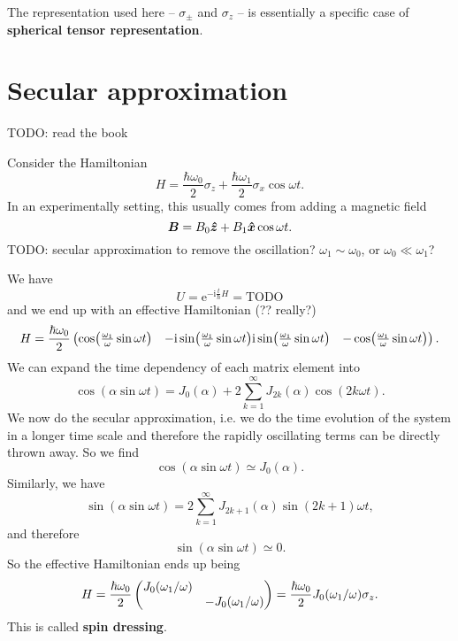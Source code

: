 \documentclass[hyperref, a4paper]{article}
\newcommand*{\ii}{\mathrm{i}}
\newcommand*{\ee}{\mathrm{e}}
\newcommand*{\concept}[1]{{\textbf{#1}}}
\def\\{}%
\begin{document}
The representation used here -- $\sigma_\pm$ and $\sigma_z$ -- 
is essentially a specific case of \concept{spherical tensor representation}.

\section{Secular approximation}

TODO: read the book

Consider the Hamiltonian 
\begin{equation}
    H = \frac{\hbar \omega_0}{2} \sigma_z + 
    \frac{\hbar \omega_1}{2} \sigma_x \cos \omega t.
\end{equation}
In an experimentally setting, 
this usually comes from adding a magnetic field 
\begin{equation}
    \vb*{B} = B_0 \vu*{z} + B_1 \vu*{x} \cos \omega t.
\end{equation}
TODO: secular approximation to remove the oscillation? $\omega_1 \sim \omega_0$, or $\omega_0 \ll \omega_1$?

We have 
\begin{equation}
    U = \ee^{- \ii \frac{t}{\hbar} H} = \text{TODO}
\end{equation}
and we end up with an effective Hamiltonian (?? really?) 
\begin{equation}
    H = \frac{\hbar \omega_0}{2} \pmqty{
        \cos(\frac{\omega_1}{\omega} \sin \omega t) &
        - \ii \sin(\frac{\omega_1}{\omega} \sin \omega t) \\
        \ii \sin(\frac{\omega_1}{\omega} \sin \omega t) &
        - \cos(\frac{\omega_1}{\omega} \sin \omega t)
    }.
\end{equation}
We can expand the time dependency of each matrix element into 
\begin{equation}
    \cos (\alpha \sin \omega t) = J_0 (\alpha) 
    + 2 \sum_{k=1}^{\infty} J_{2k}(\alpha)
    \cos(2 k \omega t).
\end{equation}
We now do the secular approximation, 
i.e. we do the time evolution of the system in a longer time scale 
and therefore the rapidly oscillating terms can be directly thrown away. 
So we find 
\begin{equation}
    \cos (\alpha \sin \omega t) \simeq J_0 (\alpha).
\end{equation}
Similarly, we have 
\begin{equation}
    \sin (\alpha \sin \omega t) = 2 \sum_{k=1}^{\infty} 
    J_{2k+1}(\alpha) \sin (2k+1) \omega t,
\end{equation}
and therefore 
\begin{equation}
    \sin (\alpha \sin \omega t) \simeq 0.
\end{equation}
So the effective Hamiltonian ends up being 
\begin{equation}
    H = \frac{\hbar \omega_0}{2} \pmqty{\dmat{J_0(\omega_1 / \omega), - J_0(\omega_1 / \omega)}}
    = \frac{\hbar \omega_0}{2} J_0(\omega_1 / \omega) \sigma_z .
\end{equation}
This is called \concept{spin dressing}.
\end{document}
